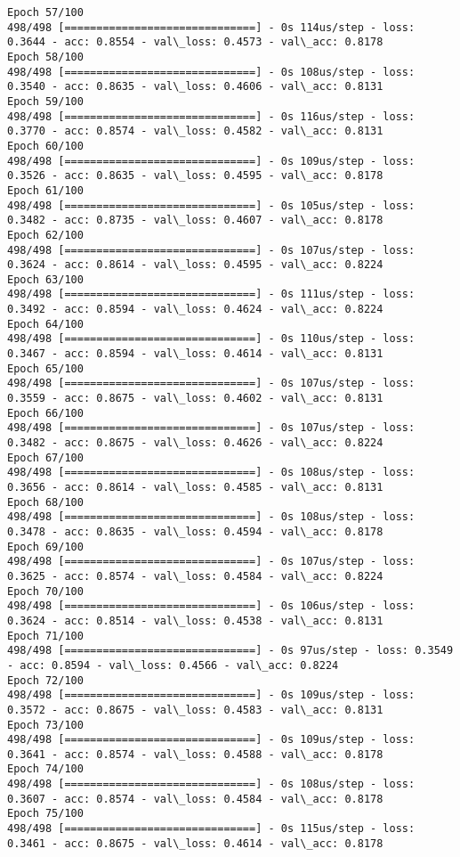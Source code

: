 \documentclass[11pt]{article}
\begin{document}
\begin{Verbatim}[commandchars=\\\{\}]
Epoch 57/100
498/498 [==============================] - 0s 114us/step - loss: 0.3644 - acc: 0.8554 - val\_loss: 0.4573 - val\_acc: 0.8178
Epoch 58/100
498/498 [==============================] - 0s 108us/step - loss: 0.3540 - acc: 0.8635 - val\_loss: 0.4606 - val\_acc: 0.8131
Epoch 59/100
498/498 [==============================] - 0s 116us/step - loss: 0.3770 - acc: 0.8574 - val\_loss: 0.4582 - val\_acc: 0.8131
Epoch 60/100
498/498 [==============================] - 0s 109us/step - loss: 0.3526 - acc: 0.8635 - val\_loss: 0.4595 - val\_acc: 0.8178
Epoch 61/100
498/498 [==============================] - 0s 105us/step - loss: 0.3482 - acc: 0.8735 - val\_loss: 0.4607 - val\_acc: 0.8178
Epoch 62/100
498/498 [==============================] - 0s 107us/step - loss: 0.3624 - acc: 0.8614 - val\_loss: 0.4595 - val\_acc: 0.8224
Epoch 63/100
498/498 [==============================] - 0s 111us/step - loss: 0.3492 - acc: 0.8594 - val\_loss: 0.4624 - val\_acc: 0.8224
Epoch 64/100
498/498 [==============================] - 0s 110us/step - loss: 0.3467 - acc: 0.8594 - val\_loss: 0.4614 - val\_acc: 0.8131
Epoch 65/100
498/498 [==============================] - 0s 107us/step - loss: 0.3559 - acc: 0.8675 - val\_loss: 0.4602 - val\_acc: 0.8131
Epoch 66/100
498/498 [==============================] - 0s 107us/step - loss: 0.3482 - acc: 0.8675 - val\_loss: 0.4626 - val\_acc: 0.8224
Epoch 67/100
498/498 [==============================] - 0s 108us/step - loss: 0.3656 - acc: 0.8614 - val\_loss: 0.4585 - val\_acc: 0.8131
Epoch 68/100
498/498 [==============================] - 0s 108us/step - loss: 0.3478 - acc: 0.8635 - val\_loss: 0.4594 - val\_acc: 0.8178
Epoch 69/100
498/498 [==============================] - 0s 107us/step - loss: 0.3625 - acc: 0.8574 - val\_loss: 0.4584 - val\_acc: 0.8224
Epoch 70/100
498/498 [==============================] - 0s 106us/step - loss: 0.3624 - acc: 0.8514 - val\_loss: 0.4538 - val\_acc: 0.8131
Epoch 71/100
498/498 [==============================] - 0s 97us/step - loss: 0.3549 - acc: 0.8594 - val\_loss: 0.4566 - val\_acc: 0.8224
Epoch 72/100
498/498 [==============================] - 0s 109us/step - loss: 0.3572 - acc: 0.8675 - val\_loss: 0.4583 - val\_acc: 0.8131
Epoch 73/100
498/498 [==============================] - 0s 109us/step - loss: 0.3641 - acc: 0.8574 - val\_loss: 0.4588 - val\_acc: 0.8178
Epoch 74/100
498/498 [==============================] - 0s 108us/step - loss: 0.3607 - acc: 0.8574 - val\_loss: 0.4584 - val\_acc: 0.8178
Epoch 75/100
498/498 [==============================] - 0s 115us/step - loss: 0.3461 - acc: 0.8675 - val\_loss: 0.4614 - val\_acc: 0.8178

\end{Verbatim}
\end{document}
